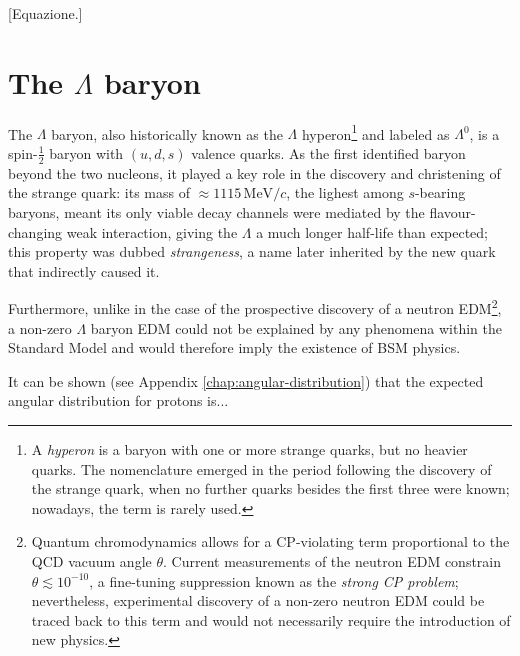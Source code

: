 [Equazione.]

\section{The \texorpdfstring{$\Lambda$}{Lambda} baryon}
\label{sec:lambda}

The $\Lambda$ baryon, also historically known as the $\Lambda$ hyperon\footnote{A \textit{hyperon} is a baryon with one or more strange quarks, but no heavier quarks. The nomenclature emerged in the period following the discovery of the strange quark, when no further quarks besides the first three were known; nowadays, the term is rarely used.} and labeled as $\Lambda^0$, is a spin-$\frac{1}{2}$ baryon with $(u,d,s)$ valence quarks.
As the first identified baryon beyond the two nucleons, it played a key role in the discovery and christening of the strange quark:
its mass of $\approx 1115\,\text{MeV}/c$, the lighest among $s$-bearing baryons, meant its only viable decay channels were mediated by the flavour-changing weak interaction, giving the $\Lambda$ a much longer half-life than expected;
this property was dubbed \textit{strangeness}, a name later inherited by the new quark that indirectly caused it.

Furthermore, unlike in the case of the prospective discovery of a neutron
EDM\footnote{Quantum chromodynamics allows for a CP-violating term proportional to the QCD vacuum angle $\theta$. Current measurements of the neutron EDM constrain $\theta \lesssim {10}^{-10}$, a fine-tuning suppression known as the \textit{strong CP problem}; nevertheless, experimental discovery of a non-zero neutron EDM could be traced back to this term and would not necessarily require the introduction of new physics.},
a non-zero $\Lambda$ baryon EDM could not be explained by any phenomena within the Standard Model and would therefore imply the existence of BSM physics.

It can be shown (see Appendix \ref{chap:angular-distribution}) that the expected angular distribution for protons is...